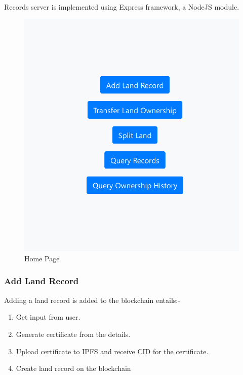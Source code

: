 \documentclass{article}
\begin{document}
        \paragraph{}
        Records server is implemented using Express framework, a NodeJS module.


        \begin{figure}[htbp]
            \includegraphics[scale=0.25]{records_home}
            \centering
            \caption{Home Page}
        \end{figure}
        
        

        \subsubsection{Add Land Record}
            Adding a land record is added to the blockchain entails:-
            \begin{enumerate}
                \item Get input from user.
                \item Generate certificate from the details.
                \item Upload certificate to IPFS and receive CID for the certificate.
                \item Create land record on the blockchain
            \end{enumerate}
\end{document}
